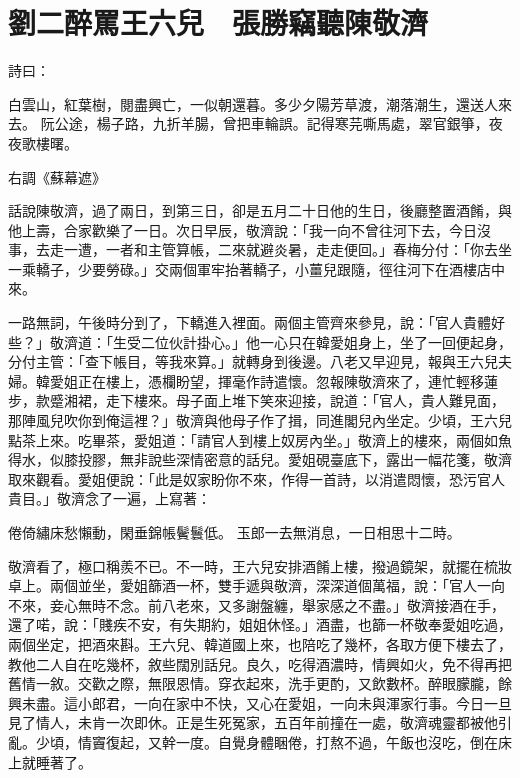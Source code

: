 %

\chapter{劉二醉罵王六兒　張勝竊聽陳敬濟}

詩曰：

白雲山，紅葉樹，閱盡興亡，一似朝還暮。多少夕陽芳草渡，潮落潮生，還送人來去。
阮公途，楊子路，九折羊腸，曾把車輪誤。記得寒芫嘶馬處，翠官銀箏，夜夜歌樓曙。

右調《蘇幕遮》

話說陳敬濟，過了兩日，到第三日，卻是五月二十日他的生日，後廳整置酒餚，與他上壽，合家歡樂了一日。次日早辰，敬濟說：「我一向不曾往河下去，今日沒事，去走一遭，一者和主管算帳，二來就避炎暑，走走便回。」春梅分付：「你去坐一乘轎子，少要勞碌。」交兩個軍牢抬著轎子，小薑兒跟隨，徑往河下在酒樓店中來。

一路無詞，午後時分到了，下轎進入裡面。兩個主管齊來參見，說：「官人貴體好些？」敬濟道：「生受二位伙計掛心。」他一心只在韓愛姐身上，坐了一回便起身，分付主管：「查下帳目，等我來算。」就轉身到後邊。八老又早迎見，報與王六兒夫婦。韓愛姐正在樓上，憑欄盼望，揮毫作詩遣懷。忽報陳敬濟來了，連忙輕移蓮步，款蹙湘裙，走下樓來。母子面上堆下笑來迎接，說道：「官人，貴人難見面，那陣風兒吹你到俺這裡？」敬濟與他母子作了揖，同進閣兒內坐定。少頃，王六兒點茶上來。吃畢茶，愛姐道：「請官人到樓上奴房內坐。」敬濟上的樓來，兩個如魚得水，似膝投膠，無非說些深情密意的話兒。愛姐硯臺底下，露出一幅花箋，敬濟取來觀看。愛姐便說：「此是奴家盼你不來，作得一首詩，以消遣悶懷，恐污官人貴目。」敬濟念了一遍，上寫著：

倦倚繡床愁懶動，閑垂錦帳鬢鬟低。
玉郎一去無消息，一日相思十二時。

敬濟看了，極口稱羨不已。不一時，王六兒安排酒餚上樓，撥過鏡架，就擺在梳妝卓上。兩個並坐，愛姐篩酒一杯，雙手遞與敬濟，深深道個萬福，說：「官人一向不來，妾心無時不念。前八老來，又多謝盤纏，舉家感之不盡。」敬濟接酒在手，還了喏，說：「賤疾不安，有失期約，姐姐休怪。」酒盡，也篩一杯敬奉愛姐吃過，兩個坐定，把酒來斟。王六兒、韓道國上來，也陪吃了幾杯，各取方便下樓去了，教他二人自在吃幾杯，敘些闊別話兒。良久，吃得酒濃時，情興如火，免不得再把舊情一敘。交歡之際，無限恩情。穿衣起來，洗手更酌，又飲數杯。醉眼朦朧，餘興未盡。這小郎君，一向在家中不快，又心在愛姐，一向未與渾家行事。今日一旦見了情人，未肯一次即休。正是生死冤家，五百年前撞在一處，敬濟魂靈都被他引亂。少頃，情竇復起，又幹一度。自覺身體睏倦，打熬不過，午飯也沒吃，倒在床上就睡著了。

